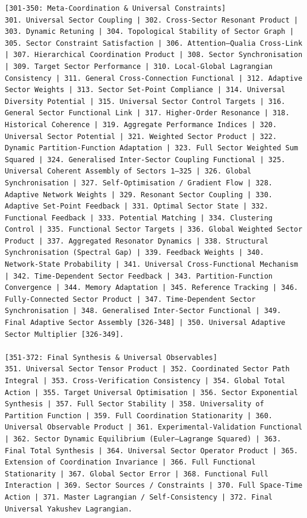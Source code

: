 \documentclass[11pt,a4paper]{article}
\begin{document}
\begin{tcolorbox}
\begin{lstlisting}[basicstyle=\scriptsize\ttfamily, breaklines=true, columns=fullflexible]
[301-350: Meta-Coordination & Universal Constraints]
301. Universal Sector Coupling | 302. Cross-Sector Resonant Product | 303. Dynamic Retuning | 304. Topological Stability of Sector Graph | 305. Sector Constraint Satisfaction | 306. Attention–Qualia Cross‑Link | 307. Hierarchical Coordination Product | 308. Sector Synchronisation | 309. Target Sector Performance | 310. Local‑Global Lagrangian Consistency | 311. General Cross‑Connection Functional | 312. Adaptive Sector Weights | 313. Sector Set‑Point Compliance | 314. Universal Diversity Potential | 315. Universal Sector Control Targets | 316. General Sector Functional Link | 317. Higher‑Order Resonance | 318. Historical Coherence | 319. Aggregate Performance Indices | 320. Universal Sector Potential | 321. Weighted Sector Product | 322. Dynamic Partition‑Function Adaptation | 323. Full Sector Weighted Sum Squared | 324. Generalised Inter‑Sector Coupling Functional | 325. Universal Coherent Assembly of Sectors 1–325 | 326. Global Synchronisation | 327. Self‑Optimisation / Gradient Flow | 328. Adaptive Network Weights | 329. Resonant Sector Coupling | 330. Adaptive Set‑Point Feedback | 331. Optimal Sector State | 332. Functional Feedback | 333. Potential Matching | 334. Clustering Control | 335. Functional Sector Targets | 336. Global Weighted Sector Product | 337. Aggregated Resonator Dynamics | 338. Structural Synchronisation (Spectral Gap) | 339. Feedback Weights | 340. Network‑State Probability | 341. Universal Cross‑Functional Mechanism | 342. Time‑Dependent Sector Feedback | 343. Partition‑Function Convergence | 344. Memory Adaptation | 345. Reference Tracking | 346. Fully‑Connected Sector Product | 347. Time‑Dependent Sector Synchronisation | 348. Generalised Inter‑Sector Functional | 349. Final Adaptive Sector Assembly [326-348] | 350. Universal Adaptive Sector Multiplier [326-349].

[351-372: Final Synthesis & Universal Observables]
351. Universal Sector Tensor Product | 352. Coordinated Sector Path Integral | 353. Cross‑Verification Consistency | 354. Global Total Action | 355. Target Universal Optimisation | 356. Sector Exponential Synthesis | 357. Full Sector Stability | 358. Universality of Partition Function | 359. Full Coordination Stationarity | 360. Universal Observable Product | 361. Experimental‑Validation Functional | 362. Sector Dynamic Equilibrium (Euler–Lagrange Squared) | 363. Final Total Synthesis | 364. Universal Sector Operator Product | 365. Extension of Coordination Invariance | 366. Full Functional Stationarity | 367. Global Sector Error | 368. Functional Full Interaction | 369. Sector Sources / Constraints | 370. Full Space‑Time Action | 371. Master Lagrangian / Self‑Consistency | 372. Final Universal Yakushev Lagrangian.


\end{lstlisting}
\end{tcolorbox}
\end{document}
